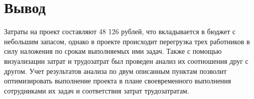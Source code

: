 \section{Вывод}

Затраты на проект составляют 48 126 рублей, что вкладывается в бюджет с небольшим
запасом, однако в проекте происходит перегрузка трех работников в силу наложения
по срокам выполняемых ими задач. Также с помощью визуализации затрат и
трудозатрат был проведен анализ их соотношения друг с другом. Учет результатов
анализа по двум описанным пунктам позволит оптимизировать выполнение проекта в
плане своевременного выполнения сотрудниками их задач и соответствия затрат
трудозатратам.

